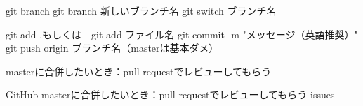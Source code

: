 git branch
git branch 新しいブランチ名
git switch ブランチ名

git add .もしくは　git add ファイル名
git commit -m "メッセージ（英語推奨）"
git push origin ブランチ名（masterは基本ダメ）

masterに合併したいとき：pull requestでレビューしてもらう

GitHub
masterに合併したいとき：pull requestでレビューしてもらう
issues